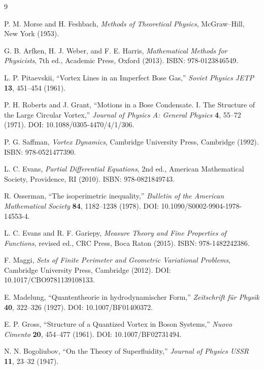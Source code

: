 \documentclass[11pt]{article}
\begin{document}
\begin{thebibliography}{9}

P. M. Morse and H. Feshbach,
\emph{Methods of Theoretical Physics},
McGraw--Hill, New York (1953).

G. B. Arfken, H. J. Weber, and F. E. Harris,
\emph{Mathematical Methods for Physicists}, 7th ed.,
Academic Press, Oxford (2013).
ISBN: 978-0123846549.

L. P. Pitaevskii,
``Vortex Lines in an Imperfect Bose Gas,''
\emph{Soviet Physics JETP} \textbf{13}, 451--454 (1961).

P. H. Roberts and J. Grant,
``Motions in a Bose Condensate. I. The Structure of the Large Circular Vortex,''
\emph{Journal of Physics A: General Physics} \textbf{4}, 55--72 (1971).
DOI: 10.1088/0305-4470/4/1/306.

P. G. Saffman,
\emph{Vortex Dynamics},
Cambridge University Press, Cambridge (1992).
ISBN: 978-0521477390.

L. C. Evans,
\emph{Partial Differential Equations}, 2nd ed.,
American Mathematical Society, Providence, RI (2010).
ISBN: 978-0821849743.

R. Osserman,
``The isoperimetric inequality,''
\emph{Bulletin of the American Mathematical Society} \textbf{84},
1182--1238 (1978).
DOI: 10.1090/S0002-9904-1978-14553-4.

L. C. Evans and R. F. Gariepy,
\emph{Measure Theory and Fine Properties of Functions},
revised ed.,
CRC Press, Boca Raton (2015).
ISBN: 978-1482242386.

F. Maggi,
\emph{Sets of Finite Perimeter and Geometric Variational Problems},
Cambridge University Press, Cambridge (2012).
DOI: 10.1017/CBO9781139108133.

E. Madelung,
``Quantentheorie in hydrodynamischer Form,''
\emph{Zeitschrift f\"ur Physik} \textbf{40}, 322--326 (1927).
DOI: 10.1007/BF01400372.

E. P. Gross,
``Structure of a Quantized Vortex in Boson Systems,''
\emph{Nuovo Cimento} \textbf{20}, 454--477 (1961).
DOI: 10.1007/BF02731494.

N. N. Bogoliubov,
``On the Theory of Superfluidity,''
\emph{Journal of Physics USSR} \textbf{11}, 23--32 (1947).

\end{thebibliography}
\end{document}
